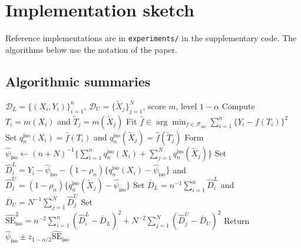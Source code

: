 \documentclass{article}
\theoremstyle{plain}
\theoremstyle{definition}
\newcommand{\1}{\mathbf{1}}
\newcommand{\mhat}{m}
\newcommand{\rhon}{\rho_n}
\begin{document}
\section{Implementation sketch}
\label{appendix:code}

Reference implementations are in \texttt{experiments/} in the
supplementary code. The algorithms below use the notation of the paper.

\subsection{Algorithmic summaries}

\begin{algorithm}[t]
\caption{Isotonic-calibrated PPI}
\label{alg:isoppi}
\begin{algorithmic}[1]
\Require \(\mathcal D_L=\{(X_i,Y_i)\}_{i=1}^n\), \(\mathcal D_U=\{\widetilde X_j\}_{j=1}^N\), score \(\mhat\), level \(1-\alpha\)
\State Compute \(T_i=\mhat(X_i)\) and \(\widetilde T_j=\mhat(\widetilde X_j)\)
\State Fit \(\hat f\in\arg\min_{f\in\mathcal F_{\mathrm{iso}}}\sum_{i=1}^n\{Y_i-f(T_i)\}^2\)
\State Set \(q_n^{\mathrm{iso}}(X_i)=\hat f(T_i)\) and \(q_n^{\mathrm{iso}}(\widetilde X_j)=\hat f(\widetilde T_j)\)
\State Form \(\widehat\psi_{\mathrm{iso}}\gets (n+N)^{-1}\{\sum_{i=1}^n q_n^{\mathrm{iso}}(X_i)+\sum_{j=1}^N q_n^{\mathrm{iso}}(\widetilde X_j)\}\)
\State Set \(\widehat D_i^L=Y_i-\widehat\psi_{\mathrm{iso}}-(1-\rhon)\{q_n^{\mathrm{iso}}(X_i)-\widehat\psi_{\mathrm{iso}}\}\) and \(\widehat D_j^U=(1-\rhon)\{q_n^{\mathrm{iso}}(\widetilde X_j)-\widehat\psi_{\mathrm{iso}}\}\)
\State Set \(\overline D_L=n^{-1}\sum_{i=1}^n\widehat D_i^L\) and \(\overline D_U=N^{-1}\sum_{j=1}^N\widehat D_j^U\)
\State Set \(\widehat{\mathrm{SE}}_{\mathrm{iso}}^2=n^{-2}\sum_{i=1}^n(\widehat D_i^L-\overline D_L)^2+N^{-2}\sum_{j=1}^N(\widehat D_j^U-\overline D_U)^2\)
\State Return \(\widehat\psi_{\mathrm{iso}} \pm z_{1-\alpha/2}\widehat{\mathrm{SE}}_{\mathrm{iso}}\)
\end{algorithmic}
\end{algorithm}
\end{document}
